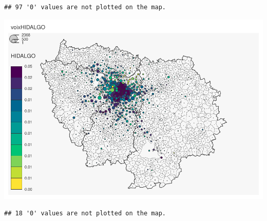 \documentclass[
]{book}
\begin{document}
\begin{verbatim}
## 97 '0' values are not plotted on the map.
\end{verbatim}

\includegraphics{bookdown-demo_files/figure-latex/unnamed-chunk-52-6.pdf}

\begin{verbatim}
## 18 '0' values are not plotted on the map.
\end{verbatim}
\end{document}
